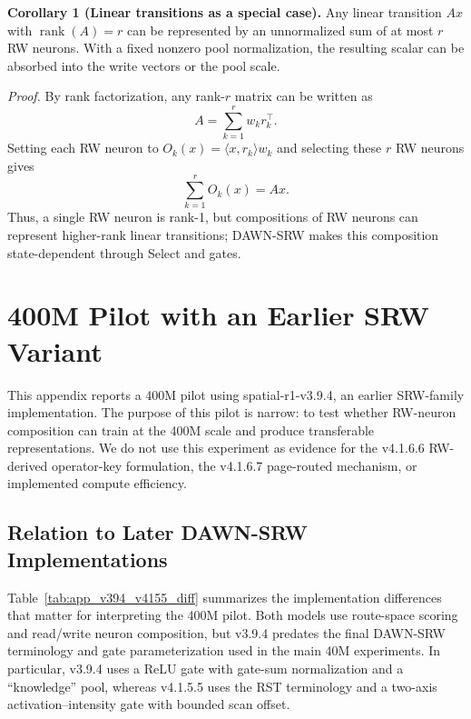 \documentclass{article}
\begin{document}
\textbf{Corollary 1 (Linear transitions as a special case).}
Any linear transition $Ax$ with $\operatorname{rank}(A)=r$ can be represented by an unnormalized sum of at most $r$ RW neurons. With a fixed nonzero pool normalization, the resulting scalar can be absorbed into the write vectors or the pool scale.

\textit{Proof.}
By rank factorization, any rank-$r$ matrix can be written as
\begin{equation}
    A=\sum_{k=1}^{r} w_k r_k^{\top} .
\end{equation}
Setting each RW neuron to $O_k(x)=\langle x,r_k\rangle w_k$ and selecting these $r$ RW neurons gives
\begin{equation}
    \sum_{k=1}^{r} O_k(x)=Ax .
\end{equation}
Thus, a single RW neuron is rank-1, but compositions of RW neurons can represent higher-rank linear transitions; DAWN-SRW makes this composition state-dependent through Select and gates.

\section{400M Pilot with an Earlier SRW Variant}
\label{app:v394_400m_pilot}

This appendix reports a 400M pilot using spatial-r1-v3.9.4, an earlier SRW-family implementation. The purpose of this pilot is narrow: to test whether RW-neuron composition can train at the 400M scale and produce transferable representations. We do not use this experiment as evidence for the v4.1.6.6 RW-derived operator-key formulation, the v4.1.6.7 page-routed mechanism, or implemented compute efficiency.

\subsection{Relation to Later DAWN-SRW Implementations}

Table~\ref{tab:app_v394_v4155_diff} summarizes the implementation differences that matter for interpreting the 400M pilot. Both models use route-space scoring and read/write neuron composition, but v3.9.4 predates the final DAWN-SRW terminology and gate parameterization used in the main 40M experiments. In particular, v3.9.4 uses a ReLU gate with gate-sum normalization and a ``knowledge'' pool, whereas v4.1.5.5 uses the RST terminology and a two-axis activation--intensity gate with bounded scan offset.
\end{document}
